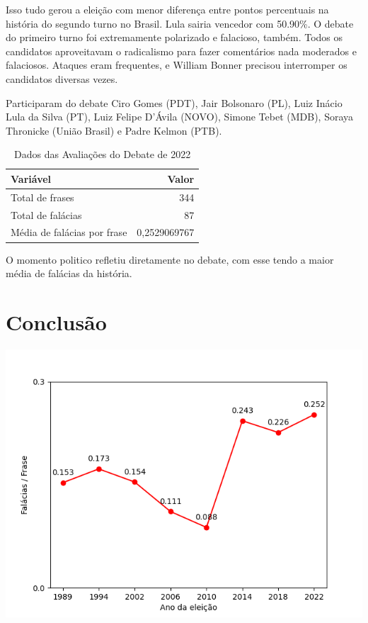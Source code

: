 \documentclass[12pt]{article}
\begin{document}
Isso tudo gerou a eleição com menor diferença entre pontos percentuais na história do segundo turno no Brasil. Lula sairia vencedor com 50.90\%. O debate do primeiro turno foi extremamente polarizado e falacioso, também. Todos os candidatos aproveitavam o radicalismo para fazer comentários nada moderados e falaciosos. Ataques eram frequentes, e William Bonner precisou interromper os candidatos diversas vezes. 

Participaram do debate Ciro Gomes (PDT), Jair Bolsonaro (PL), Luiz Inácio Lula da Silva (PT), Luiz Felipe D’Ávila (NOVO), Simone Tebet (MDB), Soraya Thronicke (União Brasil) e Padre Kelmon (PTB).

\begin{table}[ht]
\centering
\caption{Dados das Avaliações do Debate de 2022}
\label{tab:exTable1}
\begin{tabular}{l r}
\hline
\textbf{Variável} & \textbf{Valor} \\
\hline
Total de frases & 344 \\
Total de falácias & 87 \\
Média de falácias por frase & 0,2529069767 \\
\hline
\end{tabular}
\end{table}

O momento politico refletiu diretamente no debate, com esse tendo a maior média de falácias da história.

\section{Conclusão}

\begin{center}
    \includegraphics[scale=0.6]{media.png}
\end{center}
\end{document}
